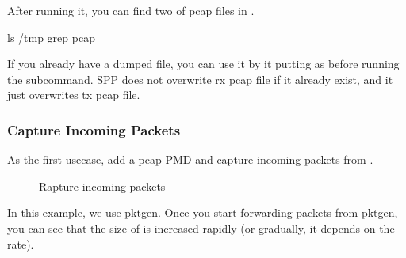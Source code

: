\documentclass[a4paper,11pt,openany,oneside,english]{sphinxmanual}
\begin{document}
After running it, you can find two of pcap files in .

\begin{sphinxVerbatim}[commandchars=\\\{\},formatcom=\footnotesize]
 ls /tmp  grep pcap\PYGZdl{}
\end{sphinxVerbatim}

If you already have a dumped file, you can use it by it putting as
 before running the  subcommand.
SPP does not overwrite rx pcap file if it already exist,
and it just overwrites tx pcap file.


\subsubsection{Capture Incoming Packets}
\label{\detokenize{usecases/spp_nfv:capture-incoming-packets}}
As the first usecase, add a pcap PMD and capture incoming packets from
.

\begin{sphinxVerbatim}[commandchars=\\\{\},formatcom=\footnotesize]
\end{sphinxVerbatim}

\begin{figure}[htbp]
\centering
\capstart

\noindent{}
\caption{Rapture incoming packets}\label{\detokenize{usecases/spp_nfv:id7}}\label{\detokenize{usecases/spp_nfv:figure-spp-pcap-incoming}}\end{figure}

In this example, we use pktgen.
Once you start forwarding packets from pktgen, you can see
that the size of  is increased rapidly
(or gradually, it depends on the rate).

\begin{sphinxVerbatim}[commandchars=\\\{\},formatcom=\footnotesize]
\end{sphinxVerbatim}
\end{document}
